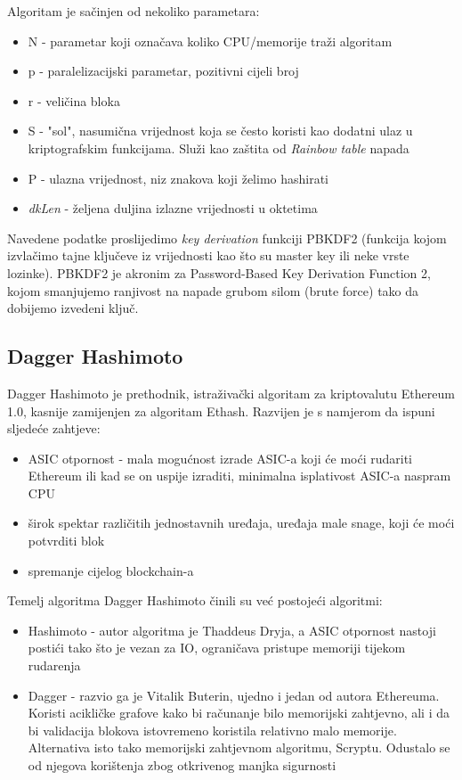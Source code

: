 \documentclass[12pt]{article}
\begin{document}
\pagebreak
Algoritam je sačinjen od nekoliko parametara:
\begin{itemize}
	\item N - parametar koji označava koliko CPU/memorije traži algoritam
	\item p - paralelizacijski parametar, pozitivni cijeli broj
	\item r - veličina bloka
	\item S - "sol", nasumična vrijednost koja se često koristi kao dodatni ulaz u kriptografskim funkcijama. Služi kao zaštita od \textit{Rainbow table} napada
	\item P - ulazna vrijednost, niz znakova koji želimo hashirati
	\item \textit{dkLen} - željena duljina izlazne vrijednosti u oktetima
\end{itemize}
%
Navedene podatke proslijedimo \textit{key derivation} funkciji PBKDF2 (funkcija kojom izvlačimo tajne ključeve iz vrijednosti kao što su master key ili neke vrste lozinke). PBKDF2 je akronim za Password-Based Key Derivation Function 2, kojom smanjujemo ranjivost na napade grubom silom (brute force) tako da dobijemo izvedeni ključ.\cite{scrypt}

\subsection{Dagger Hashimoto}
Dagger Hashimoto je prethodnik, istraživački algoritam za kriptovalutu Ethereum 1.0, kasnije zamijenjen za algoritam Ethash. Razvijen je s namjerom da ispuni sljedeće zahtjeve:
\begin{itemize}
	\item ASIC otpornost - mala mogućnost izrade ASIC-a koji će moći rudariti Ethereum ili kad se on uspije izraditi, minimalna isplativost ASIC-a naspram CPU
	\item širok spektar različitih jednostavnih uređaja, uređaja male snage, koji će moći potvrditi blok
	\item spremanje cijelog blockchain-a
\end{itemize}

\pagebreak
Temelj algoritma Dagger Hashimoto činili su već postojeći algoritmi:
\begin{itemize}
	\item Hashimoto - autor algoritma je Thaddeus Dryja, a ASIC otpornost nastoji postići tako što je vezan za IO, ograničava pristupe memoriji tijekom rudarenja 
	\item Dagger - razvio ga je Vitalik Buterin, ujedno i jedan od autora Ethereuma. Koristi acikličke grafove kako bi računanje bilo memorijski zahtjevno, ali i da bi validacija blokova istovremeno koristila relativno malo memorije. Alternativa isto tako memorijski zahtjevnom algoritmu, Scryptu. Odustalo se od njegova korištenja zbog otkrivenog manjka sigurnosti
	\cite{dagger-hashimoto}
\end{itemize}
\end{document}
